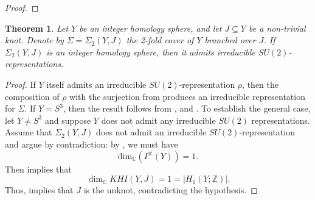 \documentclass[11pt]{amsart}
\newtheorem{theorem}{Theorem}[section]
\begin{document}
\begin{proof}
\end{proof}

\begin{theorem}%
\label{2fold-thm} Let $Y$ be an integer homology sphere, and let $J\subseteq Y$ be a non-trivial knot. Denote by $\Sigma=\Sigma_2(Y,J)$ the 2-fold cover of $Y$ branched over $J$. If $\Sigma_2(Y,J)$ is an integer homology sphere, then it admits irreducible $SU(2)$-representations.
%
\end{theorem}

\begin{proof} If $Y$ itself admits an irreducible $SU(2)$-representation $\rho$, then the composition of $\rho$ with the surjection from  produces an irreducible representation for $\Sigma$. If $Y=S^3$, then the result follows from \cite[Corollary 7.17]{KM-sutures}, and \cite[Theorem 3.1]{CNS}. To establish the general case, let $Y\neq S^3$ and suppose $Y$ does not admit any irreducible $SU(2)$ representations. Assume that $\Sigma_2(Y,J)$ does not admit an irreducible $SU(2)$-representation and argue by contradiction: by \cite[Corollary 4.10]{baldwin2018stein}, we must have 
\[
\text{dim}_{\mathbb{C}}(I^{\#}(Y)) = 1.
\] 
Then \cite[Theorem 4.1]{smalldehn} implies that
\[
\dim_{\mathbb{C}} KHI(Y,J) = 1 = |H_1(Y;\mathbb{Z})|.
\]
Thus, \cite[Theorem 1.5]{li2024enhanced} implies that $J$ is the unknot, contradicting the hypothesis.

\end{proof}
\end{document}
